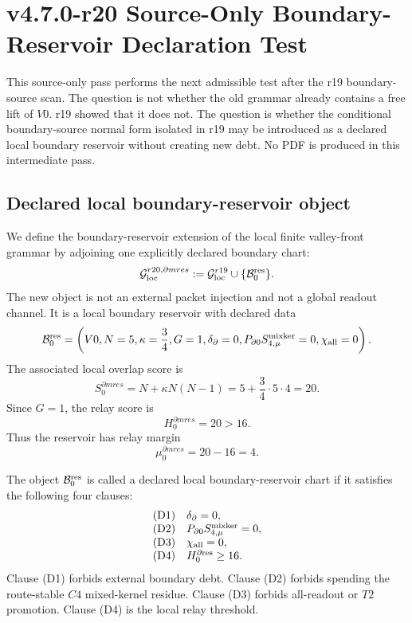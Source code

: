\clearpage
\section{v4.7.0-r20 Source-Only Boundary-Reservoir Declaration Test}
\label{sec:v470-r20-boundary-reservoir-declaration-test}

This source-only pass performs the next admissible test after the r19
boundary-source scan.  The question is not whether the old grammar already
contains a free lift of \(V0\).  r19 showed that it does not.  The question is
whether the conditional boundary-source normal form isolated in r19 may be
introduced as a declared local boundary reservoir without creating new debt.
No PDF is produced in this intermediate pass.

\subsection{Declared local boundary-reservoir object}
\label{subsec:v470-r20-declared-boundary-reservoir-object}

We define the boundary-reservoir extension of the local finite valley-front
grammar by adjoining one explicitly declared boundary chart:
\[
\mathcal G_{\rm loc}^{r20,\partial{
m res}}
:=
\mathcal G_{\rm loc}^{r19}
\cup
\{\mathcal B_0^{\rm res}\}.
\]
The new object is not an external packet injection and not a global readout
channel.  It is a local boundary reservoir with declared data
\[
\mathcal B_0^{\rm res}
=
\left(
V0,
N=5,
\kappa=\frac34,
G=1,
\delta_{\partial}=0,
P_{\partial0}S_{4,\mu}^{\rm mixker}=0,
\chi_{\rm all}=0
\right).
\]
The associated local overlap score is
\[
S_0^{\partial{
m res}}
=
N+\kappa N(N-1)
=
5+\frac34\cdot 5\cdot4
=20.
\]
Since \(G=1\), the relay score is
\[
H_0^{\partial{
m res}}
=20>16.
\]
Thus the reservoir has relay margin
\[
\mu_0^{\partial{
m res}}
=20-16=4.
\]

\begin{definition}
\label{def:v470-r20-boundary-reservoir-declaration}
The object \(\mathcal B_0^{\rm res}\) is called a declared local
boundary-reservoir chart if it satisfies the following four clauses:
\[
\begin{array}{ll}
{\rm (D1)} & \delta_{\partial}=0,\\
{\rm (D2)} & P_{\partial0}S_{4,\mu}^{\rm mixker}=0,\\
{\rm (D3)} & \chi_{\rm all}=0,\\
{\rm (D4)} & H_0^{\partial{\rm res}}\ge 16.
\end{array}
\]
Clause (D1) forbids external boundary debt.  Clause (D2) forbids spending the
route-stable \(C4\) mixed-kernel residue.  Clause (D3) forbids all-readout or
\(T2\) promotion.  Clause (D4) is the local relay threshold.
\end{definition}

